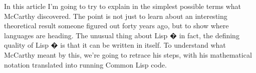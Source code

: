 In this
                    article I'm going to try to explain in the simplest possible
                    terms what McCarthy discovered. The point is not just to
                    learn about an interesting theoretical result someone
                    figured out forty years ago, but to show where languages are
                    heading. The unusual thing about Lisp � in fact, the
                    defining quality of Lisp � is that it can be written in
                    itself. To understand what McCarthy meant by this, we're
                    going to retrace his steps, with his mathematical notation
                    translated into running Common Lisp code.




              
            
          
